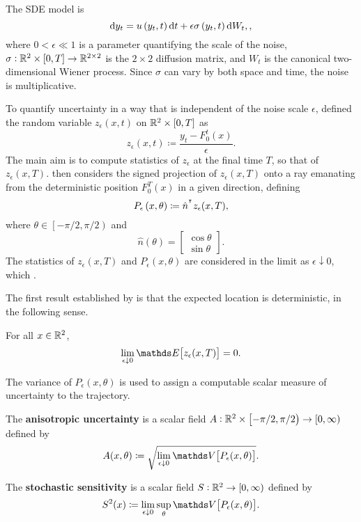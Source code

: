 
The SDE model is
\begin{equation}
	\sde{y_t}{u\left(y_t, t\right)}{\epsilon\sigma\left(y_t, t\right)},
	\label{eqn:ss_sde},
\end{equation}
where \(0 < \epsilon \ll 1\) is a parameter quantifying the scale of the noise, \(\sigma:	\mathbb{R}^2\times[0,T] \to \mathbb{R}^{2\times 2}\) is the \(2\times 2\) diffusion matrix, and \(W_t\) is the canonical two-dimensional Wiener process.
Since \(\sigma\) can vary by both space and time, the noise is multiplicative.

To quantify uncertainty in a way that is independent of the noise scale \(\epsilon\), \cite{Balasuriya_2020_StochasticSensitivityComputable} defined the random variable \(z_\epsilon\left(x,t\right)\) on \(\mathbb{R}^2 \times [0,T]\) as
\[
	z_\epsilon\left(x,t\right) \coloneqq \frac{y_t - F_0^t(x)}{\epsilon}.
\]
The main aim is to compute statistics of \(z_\epsilon\) at the final time \(T\), so that of \(z_\epsilon\left(x,T\right)\).
\citet{Balasuriya_2020_StochasticSensitivityComputable} then considers the signed projection of \(z_\epsilon\left(x,T\right)\) onto a ray emanating from the deterministic position \(F_0^T(x)\) in a given direction, defining
\[
	P_\epsilon\left(x,\theta\right) \coloneqq \hat{n}^{^{\intercal}} z_\epsilon(x,T),
\]
where \(\theta \in \left[-\pi/2, \pi/2\right)\) and
\[
	\hat{n}(\theta) = \begin{bmatrix}
		\cos{\theta} \\
		\sin{\theta}
	\end{bmatrix}.
\]
The statistics of \(z_\epsilon\left(x,T\right)\) and \(P_\epsilon(x,\theta)\) are considered in the limit as \(\epsilon\downarrow 0\), which .

The first result established by \cite{Balasuriya_2020_StochasticSensitivityComputable} is that the expected location is deterministic, in the following sense.
\begin{theorem}
	For all \(x \in \mathbb{R}^2\),
	\[
		\lim_{\epsilon\downarrow 0}\avg{z_\epsilon(x,T)} = 0.
	\]
\end{theorem}

The variance of \(P_\epsilon\left(x,\theta\right)\) is used to assign a computable scalar measure of uncertainty to the trajectory.

\begin{definition}
	\begin{alpharate}
		\item The \textbf{anisotropic uncertainty} is a scalar field \(A: \mathbb{R}^2\times\left[-\pi/2, \pi/2\right) \to [0,\infty)\) defined by
		\[
			A(x,\theta) \coloneqq \sqrt{\lim_{\epsilon\downarrow 0}\var{P_\epsilon(x,\theta)}}.
		\]

		\item The \textbf{stochastic sensitivity} is a scalar field \(S: \mathbb{R}^2 \to [0,\infty)\) defined by
		\[
			S^2(x) \coloneqq \lim_{\epsilon\downarrow 0}\sup_{\theta}{\var{P_\epsilon(x,\theta)}}.
		\]
	\end{alpharate}
\end{definition}

